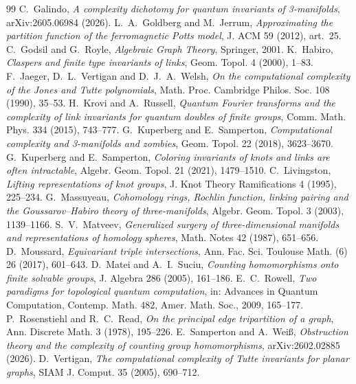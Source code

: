 \documentclass[11pt]{article}
\theoremstyle{definition}
\theoremstyle{remark}
\begin{document}
\begin{thebibliography}{99}
 C.~Galindo, \emph{A complexity dichotomy for quantum invariants of
3-manifolds}, arXiv:2605.06984 (2026).
 L.~A.~Goldberg and M.~Jerrum, \emph{Approximating the partition
function of the ferromagnetic Potts model}, J. ACM 59 (2012), art.~25.
 C.~Godsil and G.~Royle, \emph{Algebraic Graph Theory}, Springer,
2001.
 K.~Habiro, \emph{Claspers and finite type invariants of links},
Geom. Topol. 4 (2000), 1--83.
 F.~Jaeger, D.~L.~Vertigan and D.~J.~A.~Welsh, \emph{On the
computational complexity of the Jones and Tutte polynomials}, Math. Proc.
Cambridge Philos. Soc. 108 (1990), 35--53.
 H.~Krovi and A.~Russell, \emph{Quantum Fourier transforms and the
complexity of link invariants for quantum doubles of finite groups}, Comm. Math.
Phys. 334 (2015), 743--777.
 G.~Kuperberg and E.~Samperton, \emph{Computational complexity and
3-manifolds and zombies}, Geom. Topol. 22 (2018), 3623--3670.
 G.~Kuperberg and E.~Samperton, \emph{Coloring invariants of knots
and links are often intractable}, Algebr. Geom. Topol. 21 (2021), 1479--1510.
 C.~Livingston, \emph{Lifting representations of knot groups}, J.
Knot Theory Ramifications 4 (1995), 225--234.
 G.~Massuyeau, \emph{Cohomology rings, Rochlin function, linking
pairing and the Goussarov--Habiro theory of three-manifolds}, Algebr. Geom.
Topol. 3 (2003), 1139--1166.
 S.~V.~Matveev, \emph{Generalized surgery of three-dimensional
manifolds and representations of homology spheres}, Math. Notes 42 (1987),
651--656.
 D.~Moussard, \emph{Equivariant triple intersections}, Ann. Fac.
Sci. Toulouse Math. (6) 26 (2017), 601--643.
 D.~Matei and A.~I.~Suciu, \emph{Counting homomorphisms onto finite
solvable groups}, J. Algebra 286 (2005), 161--186.
 E.~C.~Rowell, \emph{Two paradigms for topological quantum
computation}, in: Advances in Quantum Computation, Contemp. Math. 482, Amer.
Math. Soc., 2009, 165--177.
 P.~Rosenstiehl and R.~C.~Read, \emph{On the principal edge
tripartition of a graph}, Ann. Discrete Math. 3 (1978), 195--226.
 E.~Samperton and A.~Wei\ss, \emph{Obstruction theory and the
complexity of counting group homomorphisms}, arXiv:2602.02885 (2026).
 D.~Vertigan, \emph{The computational complexity of Tutte
invariants for planar graphs}, SIAM J. Comput. 35 (2005), 690--712.
\end{thebibliography}
\end{document}
